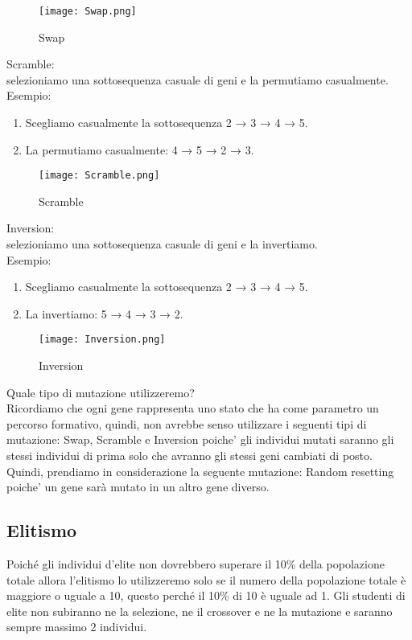 \documentclass[10pt,a4paper]{article}
\begin{document}
    \begin{figure}[h!]
      \centering
      \caption{Swap}
      \texttt{[image: Swap.png]}
      \label{Swap}
    \end{figure}
    
    Scramble:\\
    selezioniamo una sottosequenza casuale di geni e la permutiamo casualmente.
    Esempio:\\
    \begin{enumerate}
      \item Scegliamo casualmente la sottosequenza 2 → 3 → 4 → 5.
      \item La permutiamo casualmente: 4 → 5 → 2 → 3.
    \end{enumerate}
    \begin{figure}[h!]
      \centering
      \caption{Scramble}
      \texttt{[image: Scramble.png]}
      \label{Scramble}
    \end{figure}
     
    Inversion:\\
    selezioniamo una sottosequenza casuale di geni e la invertiamo.\\
    Esempio:\\
    \begin{enumerate}
      \item Scegliamo casualmente la sottosequenza 2 → 3 → 4 → 5.
      \item La invertiamo: 5 → 4 → 3 → 2.
    \end{enumerate}
    \begin{figure}[h!]
      \centering
      \caption{Inversion}
      \texttt{[image: Inversion.png]}
      \label{Inversion}
    \end{figure}
    
    Quale tipo di mutazione utilizzeremo?\\
    Ricordiamo che ogni gene rappresenta uno stato che ha come parametro un percorso formativo, quindi, non avrebbe senso utilizzare i 
    seguenti tipi di mutazione: Swap, Scramble e Inversion poiche' gli individui mutati saranno gli 
    stessi individui di prima solo che avranno gli stessi geni cambiati di posto.\\
    Quindi, prendiamo in considerazione la seguente mutazione: Random resetting poiche' un gene sarà 
    mutato in un altro gene diverso.
    
    \subsection{Elitismo}
    \label{elitismoSubsection}
    Poiché gli individui d'elite non dovrebbero superare il 10\% della popolazione totale 
    allora l'elitismo lo utilizzeremo solo se il numero della popolazione totale è maggiore o uguale a 10, questo 
    perché il 10\% di 10 è uguale ad 1.
    Gli studenti di elite non subiranno ne la selezione, ne il crossover e ne la mutazione 
    e saranno sempre massimo 2 individui.
    
\end{document}
